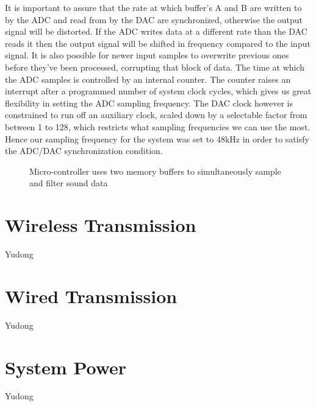 It is important to assure that the rate at which buffer's A and B are written to by the ADC and read from by the DAC are synchronized, otherwise the output signal will be distorted. If the ADC writes data at a different rate than the DAC reads it then the output signal will be shifted in frequency compared to the input signal. It is also possible for newer input samples to overwrite previous ones before they've been processed, corrupting that block of data. The time at which the ADC samples is controlled by an internal counter. The counter raises an interrupt after a programmed number of system clock cycles, which gives us great flexibility in setting the ADC sampling frequency. The DAC clock however is constrained to run off an auxiliary clock, scaled down by a selectable factor from between 1 to 128, which restricts what sampling frequencies we can use the most. Hence our sampling frequency for the system was set to 48kHz in order to satisfy the ADC/DAC synchronization condition.

\begin{figure}[!htb]
	\centering
	\caption{Micro-controller uses two memory buffers to simultaneously sample and filter sound data}
	\label{fig:mcu_operation}
\end{figure}



\section{Wireless Transmission}
Yudong

\section{Wired Transmission}
Yudong

\section{System Power} \label{sys_power}
Yudong